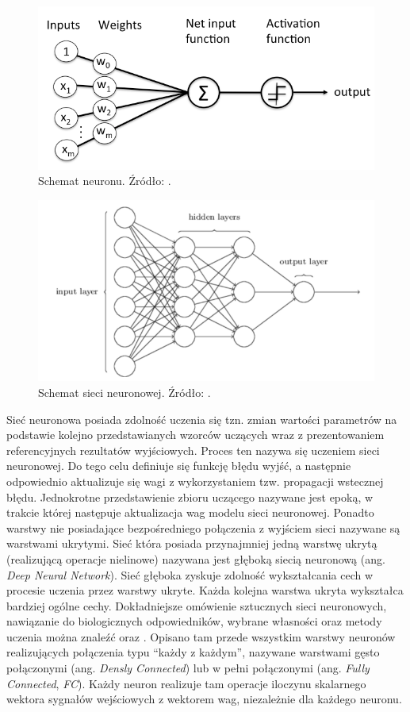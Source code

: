 \begin{figure}
    \centering
    \includegraphics[width=0.6\linewidth]{images/neuron.png}
    \caption{Schemat neuronu. Źródło: \cite{neuron}.}
    \label{fig:neuron}
\end{figure}
\begin{figure}
    \centering
    \includegraphics[width=0.6\linewidth]{images/net_schem.png}
    \caption{Schemat sieci neuronowej. Źródło: \cite{net_schem}.}
    \label{fig:net_schem}
\end{figure}

Sieć neuronowa posiada zdolność uczenia się tzn. zmian wartości parametrów na podstawie kolejno przedstawianych wzorców uczących wraz z prezentowaniem referencyjnych rezultatów wyjściowych.
Proces ten nazywa się uczeniem sieci neuronowej.
Do tego celu definiuje się funkcję błędu wyjść, a następnie odpowiednio aktualizuje się wagi z wykorzystaniem tzw. propagacji wstecznej błędu.
Jednokrotne przedstawienie zbioru uczącego nazywane jest epoką, w trakcie której następuje aktualizacja wag modelu sieci neuronowej.
Ponadto warstwy nie posiadające bezpośredniego połączenia z wyjściem sieci nazywane są warstwami ukrytymi.
Sieć która posiada przynajmniej jedną warstwę ukrytą (realizującą operacje nielinowe) nazywana jest głęboką siecią neuronową (ang. \emph{Deep Neural Network}).
Sieć głęboka zyskuje zdolność wykształcania cech w procesie uczenia przez warstwy ukryte. 
Każda kolejna warstwa ukryta wykształca bardziej ogólne cechy. 
Dokładniejsze omówienie sztucznych sieci neuronowych, nawiązanie do biologicznych odpowiedników, wybrane własności oraz metody uczenia można znaleźć \cite{SN_tadeusiewicz} oraz \cite{net_train}. 
Opisano tam przede wszystkim warstwy neuronów realizujących połączenia typu ``każdy z każdym'', nazywane warstwami gęsto połączonymi (ang. \emph{Densly Connected}) lub w pełni połączonymi (ang. \emph{Fully Connected}, \emph{FC}). 
Każdy neuron realizuje tam operacje iloczynu skalarnego wektora sygnałów wejściowych z wektorem wag, niezależnie dla każdego neuronu.

